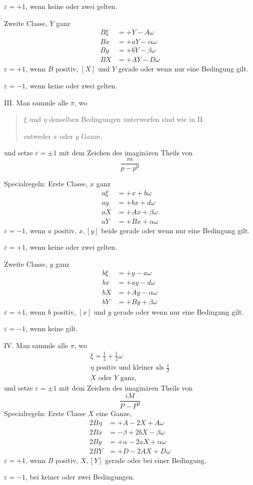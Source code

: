 $\varepsilon=+1$, wenn keine oder zwei gelten.

Zweite Classe, $Y$ ganz
\[
\begin{aligned}
B\xi&=+Y-A\omega\\
Bx&=+aY-\alpha\omega\\
By&=+bY-\beta\omega\\
BX&=+AY-D\omega
\end{aligned}
\]
$\varepsilon=+1$, wenn $B$ positiv, $[X]$ und $Y$ gerade oder wenn nur eine Bedingung gilt.

$\varepsilon=-1$, wenn keine oder zwei gelten.

III. Man sammle alle $\pi$, wo
\begin{quote}
$\xi$ und $\eta$ denselben Bedingungen unterworfen sind wie in II.\par
entweder $x$ oder $y$ Ganze,
\end{quote}
und setze $\varepsilon=\pm1$ mit dem Zeichen des imaginären Theils von
\[
\frac{m}{p-p^0}
\]

%
Specialregeln: Erste Classe, $x$ ganz
\[
\begin{aligned}
a\xi&=+x+b\omega\\
ay&=+bx+d\omega\\
aX&=+Ax+\beta\omega\\
aY&=+Bx+\alpha\omega
\end{aligned}
\]
$\varepsilon=-1$, wenn $a$ positiv, $x,[y]$ beide gerade oder wenn nur eine Bedingung gilt.

$\varepsilon=+1$, wenn keine oder zwei gelten.

Zweite Classe, $y$ ganz
\[
\begin{aligned}
b\xi&=+y-a\omega\\
bx&=+ay-d\omega\\
bX&=+Ay-\alpha\omega\\
bY&=+By+\beta\omega
\end{aligned}
\]
$\varepsilon=+1$, wenn $b$ positiv, $[x]$ und $y$ gerade oder wenn nur eine Bedingung gilt.

$\varepsilon=-1$, wenn keine gilt.

IV. Man sammle alle $\pi$, wo
\[
\begin{array}{l}
\xi=\frac12+\frac12\omega\\
\eta\text{ positiv und kleiner als }\frac12\\
X\text{ oder }Y\text{ ganz,}
\end{array}
\]
und setze $\varepsilon=\pm1$ mit dem Zeichen des imaginären Theils von
\[
\frac{iM}{P-P^0}
\]
Specialregeln: Erste Classe $X$ eine Ganze,
\[
\begin{aligned}
2B\eta&=+A-2X+A\omega\\
2Bx&=-\beta+2bX-\beta\omega\\
2By&=+\alpha-2aX+\alpha\omega\\
2BY&=+D-2AX+D\omega
\end{aligned}
\]
$\varepsilon=+1$, wenn $B$ positiv, $X,[Y]$ gerade oder bei einer Bedingung,

$\varepsilon=-1$, bei keiner oder zwei Bedingungen.

